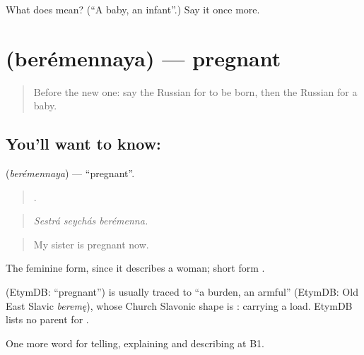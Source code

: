 \begin{tcolorbox}[breakable,colback=teal!4,colframe=teal!35!black,title={Before you move on}]
What does  mean? (\textquotedblleft{}A baby, an infant\textquotedblright{}.) Say it once more.
\end{tcolorbox}
\section[\texorpdfstring{\ru{беременная} (berémennaya)}{беременная (berémennaya)}]{ (berémennaya) — pregnant}

\label{lesson:RU-C303-beremennaya}



\begin{quote}
Before the new one: say the Russian for to be born, then the Russian for a baby.
\end{quote}

\subsection*{You'll want to know: }
\textbf{} (\emph{berémennaya}) — \textquotedblleft{}pregnant\textquotedblright{}.

\begin{quote}
  .
\end{quote}

\begin{quote}
\emph{Sestrá seychás berémenna.}
\end{quote}

\begin{quote}
My sister is pregnant now.
\end{quote}

The feminine form, since it describes a woman; short form \emph{}.

\begin{cousinweb}
\emph{} (EtymDB: \textquotedblleft{}pregnant\textquotedblright{}) is usually traced to \emph{} \textquotedblleft{}a burden, an armful\textquotedblright{} (EtymDB: Old East Slavic \emph{beremę}), whose Church Slavonic shape is \emph{}: carrying a load. EtymDB lists no parent for \emph{}.
\end{cousinweb}

\begin{grammarlens}[title={What you've built}]
One more word for telling, explaining and describing at B1.
\end{grammarlens}


